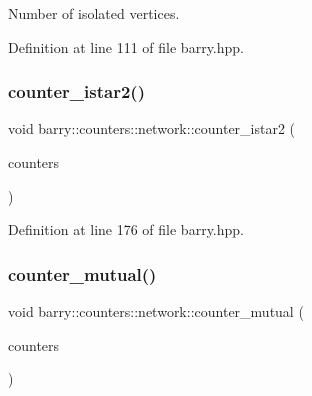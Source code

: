 Number of isolated vertices. 



Definition at line 111 of file barry.\+hpp.

\mbox{\label{namespacebarry_1_1counters_1_1network_a95eea8464d85c595efa305cdf9a5a82b}} 
\subsubsection{\texorpdfstring{counter\+\_\+istar2()}{counter\_istar2()}}
{\footnotesize\ttfamily void barry\+::counters\+::network\+::counter\+\_\+istar2 (\begin{DoxyParamCaption}\item[{\hyperlink{namespacebarry_1_1counters_1_1network_a3b3c590303d47840d1967372ae495d95}{Net\+Counter\+Vector} $\ast$}]{counters }\end{DoxyParamCaption})\hspace{0.3cm}{\ttfamily [inline]}}



Definition at line 176 of file barry.\+hpp.

\mbox{\label{namespacebarry_1_1counters_1_1network_afc4086d5788c8d5fa60ec529d9fa15dd}} 
\subsubsection{\texorpdfstring{counter\+\_\+mutual()}{counter\_mutual()}}
{\footnotesize\ttfamily void barry\+::counters\+::network\+::counter\+\_\+mutual (\begin{DoxyParamCaption}\item[{\hyperlink{namespacebarry_1_1counters_1_1network_a3b3c590303d47840d1967372ae495d95}{Net\+Counter\+Vector} $\ast$}]{counters }\end{DoxyParamCaption})\hspace{0.3cm}{\ttfamily [inline]}}



